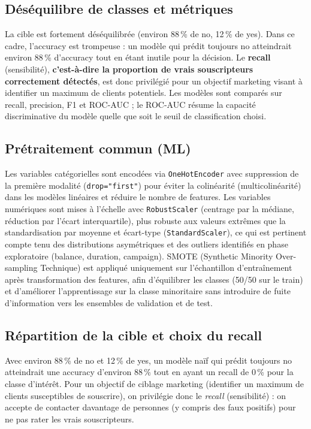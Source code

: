 \documentclass[11pt,a4paper]{article}
\begin{document}
\subsection{Déséquilibre de classes et métriques}
La cible est fortement déséquilibrée (environ 88\,\% de no, 12\,\% de yes). Dans ce cadre, l'accuracy est trompeuse : un modèle qui prédit toujours no atteindrait environ 88\,\% d'accuracy tout en étant inutile pour la décision. Le \textbf{recall} (sensibilité), \textbf{c'est-à-dire la proportion de vrais souscripteurs correctement détectés}, est donc privilégié pour un objectif marketing visant à identifier un maximum de clients potentiels. Les modèles sont comparés sur recall, precision, F1 et ROC-AUC ; le ROC-AUC résume la capacité discriminative du modèle quelle que soit le seuil de classification choisi.

\subsection{Prétraitement commun (ML)}
Les variables catégorielles sont encodées via \texttt{OneHotEncoder} avec suppression de la première modalité (\texttt{drop="first"}) pour éviter la colinéarité (multicolinéarité) dans les modèles linéaires et réduire le nombre de features. Les variables numériques sont mises à l'échelle avec \texttt{RobustScaler} (centrage par la médiane, réduction par l'écart interquartile), plus robuste aux valeurs extrêmes que la standardisation par moyenne et écart-type (\texttt{StandardScaler}), ce qui est pertinent compte tenu des distributions asymétriques et des outliers identifiés en phase exploratoire (balance, duration, campaign). SMOTE (Synthetic Minority Over-sampling Technique) est appliqué uniquement sur l'échantillon d'entraînement après transformation des features, afin d'équilibrer les classes (50/50 sur le train) et d'améliorer l'apprentissage sur la classe minoritaire sans introduire de fuite d'information vers les ensembles de validation et de test.

\subsection{Répartition de la cible et choix du recall}
Avec environ 88\,\% de no et 12\,\% de yes, un modèle naïf qui prédit toujours no atteindrait une accuracy d'environ 88\,\% tout en ayant un recall de 0\,\% pour la classe d'intérêt. Pour un objectif de ciblage marketing (identifier un maximum de clients susceptibles de souscrire), on privilégie donc le \emph{recall} (sensibilité) : on accepte de contacter davantage de personnes (y compris des faux positifs) pour ne pas rater les vrais souscripteurs.
\end{document}
